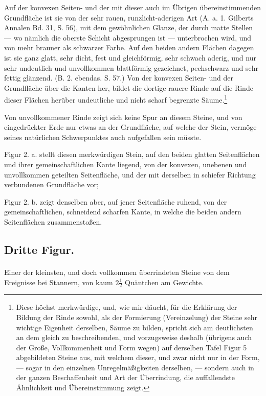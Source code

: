 \documentclass[a4paper, 11pt, oneside, german]{article}
\begin{document}
Auf der konvexen Seiten- und der mit dieser auch im Übrigen übereinstimmenden Grundfläche ist sie von der sehr rauen, runzlicht-aderigen Art (A. a. 1. Gilberts Annalen Bd. 31, S. 56), mit dem gewöhnlichen Glanze, der durch matte Stellen --- wo nämlich die oberste Schicht abgesprungen ist --- unterbrochen wird, und von mehr brauner als schwarzer Farbe. Auf den beiden andern Flächen dagegen ist sie ganz glatt, sehr dicht, fest und gleichförmig, sehr schwach aderig, und nur sehr undeutlich und unvollkommen blattförmig gezeichnet, pechschwarz und sehr fettig glänzend. (B. 2. ebendas. S. 57.) Von der konvexen Seiten- und der Grundfläche über die Kanten her, bildet die dortige rauere Rinde auf die Rinde dieser Flächen herüber undeutliche und nicht scharf begrenzte Säume.\footnote{Diese höchst merkwürdige, und, wie mir däucht, für die Erklärung der Bildung der Rinde sowohl, als der Formierung (Vereinzelung) der Steine sehr wichtige Eigenheit derselben, Säume zu bilden, spricht sich am deutlichsten an dem gleich zu beschreibenden, und vorzugsweise deshalb (übrigens auch der Große, Vollkommenheit und Form wegen) auf derselben Tafel Figur 5 abgebildeten Steine aus, mit welchem dieser, und zwar nicht nur in der Form, --- sogar in den einzelnen Unregelmäßigkeiten derselben, --- sondern auch in der ganzen Beschaffenheit und Art der Überrindung, die auffallendste Ähnlichkeit und Übereinstimmung zeigt.}

Von unvollkommener Rinde zeigt sich keine Spur an diesem Steine, und von eingedrückter Erde nur etwas an der Grundfläche, auf welche der Stein, vermöge seines natürlichen Schwerpunktes auch aufgefallen sein müsste.

Figur 2. a. stellt diesen merkwürdigen Stein, auf den beiden glatten Seitenflächen und ihrer gemeinschaftlichen Kante liegend, von der konvexen, unebenen und unvollkommen geteilten Seitenfläche, und der mit derselben in schiefer Richtung verbundenen Grundfläche vor;

Figur 2. b. zeigt denselben aber, auf jener Seitenfläche ruhend, von der gemeinschaftlichen, schneidend scharfen Kante, in welche die beiden andern Seitenflächen zusammenstoßen.

\subsection{Dritte Figur.}
\paragraph{}
Einer der kleinsten, und doch vollkommen überrindeten Steine von dem Ereignisse bei Stannern, von kaum $2\frac{1}{2}$ Quäntchen am Gewichte.
\end{document}
